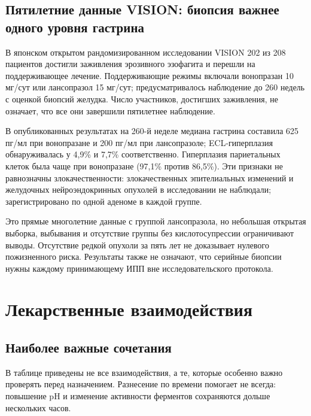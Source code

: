 \documentclass[11pt,a4paper,notitlepage]{report}
\newcommand{\src}[1]{\unskip\space\cite{#1}}
\begin{document}
\subsection{Пятилетние данные VISION: биопсия важнее одного уровня гастрина}
В японском открытом рандомизированном исследовании VISION 202 из 208 пациентов достигли заживления эрозивного эзофагита и перешли на поддерживающее лечение. Поддерживающие режимы включали вонопразан 10 мг/сут или лансопразол 15 мг/сут; предусматривалось наблюдение до 260 недель с оценкой биопсий желудка. Число участников, достигших заживления, не означает, что все они завершили пятилетнее наблюдение.\src{vision2025}

В опубликованных результатах на 260-й неделе медиана гастрина составила 625 пг/мл при вонопразане и 200 пг/мл при лансопразоле; ECL-гиперплазия обнаруживалась у 4,9\% и 7,7\% соответственно. Гиперплазия париетальных клеток была чаще при вонопразане (97,1\% против 86,5\%). Эти признаки не равнозначны злокачественности: злокачественных эпителиальных изменений и желудочных нейроэндокринных опухолей в исследовании не наблюдали; зарегистрировано по одной аденоме в каждой группе.\src{vision2025}

Это прямые многолетние данные с группой лансопразола, но небольшая открытая выборка, выбывания и отсутствие группы без кислотосупрессии ограничивают выводы. Отсутствие редкой опухоли за пять лет не доказывает нулевого пожизненного риска. Результаты также не означают, что серийные биопсии нужны каждому принимающему ИПП вне исследовательского протокола.\src{vision2025,acggerd}

\section{Лекарственные взаимодействия}
\label{sec:interactions}

\subsection{Наиболее важные сочетания}
В таблице приведены не все взаимодействия, а те, которые особенно важно проверять перед назначением. Разнесение по времени помогает не всегда: повышение pH и изменение активности ферментов сохраняются дольше нескольких часов.\src{uslabel,sps}
\end{document}
